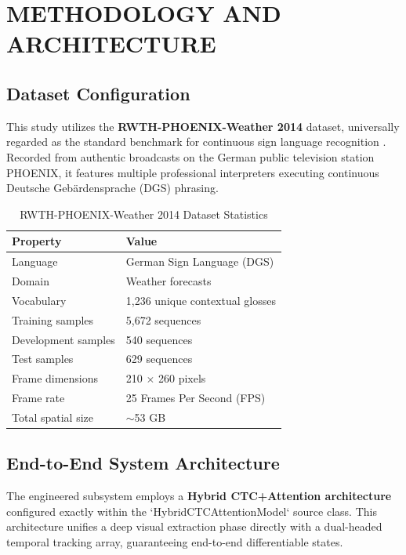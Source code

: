 \chapter{METHODOLOGY AND ARCHITECTURE}

\section{Dataset Configuration}

This study utilizes the \textbf{RWTH-PHOENIX-Weather 2014} dataset, universally regarded as the standard benchmark for continuous sign language recognition \cite{koller2015continuous}. Recorded from authentic broadcasts on the German public television station PHOENIX, it features multiple professional interpreters executing continuous Deutsche Gebärdensprache (DGS) phrasing. 

\begin{table}[H]
\centering
\caption{RWTH-PHOENIX-Weather 2014 Dataset Statistics}
\label{tab:dataset}
\begin{tabular}{@{}ll@{}}
\toprule
\textbf{Property} & \textbf{Value} \\
\midrule
Language & German Sign Language (DGS) \\
Domain & Weather forecasts \\
Vocabulary & 1,236 unique contextual glosses \\
Training samples & 5,672 sequences \\
Development samples & 540 sequences \\
Test samples & 629 sequences \\
Frame dimensions & 210 $\times$ 260 pixels \\
Frame rate & 25 Frames Per Second (FPS) \\
Total spatial size & $\sim$53 GB \\
\bottomrule
\end{tabular}
\end{table}

\section{End-to-End System Architecture}

The engineered subsystem employs a \textbf{Hybrid CTC+Attention architecture} \cite{watanabe2017hybrid} configured exactly within the `HybridCTCAttentionModel` source class. This architecture unifies a deep visual extraction phase directly with a dual-headed temporal tracking array, guaranteeing end-to-end differentiable states. 

